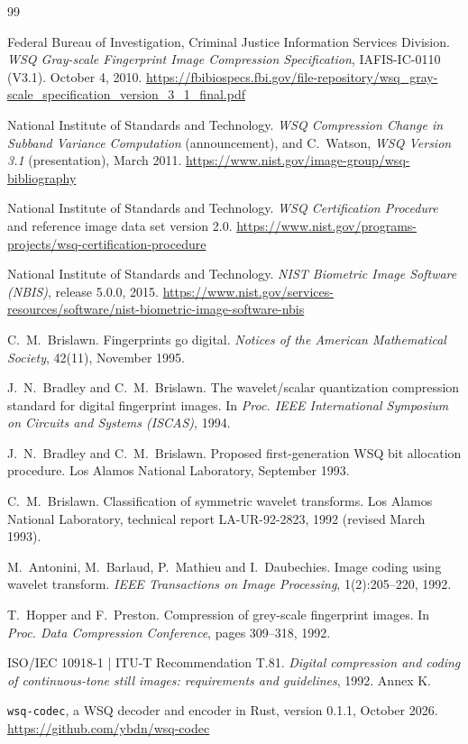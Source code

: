 \begin{thebibliography}{99}
\small

Federal Bureau of Investigation, Criminal Justice Information Services Division.
\emph{WSQ Gray-scale Fingerprint Image Compression Specification}, IAFIS-IC-0110 (V3.1).
October 4, 2010.
\url{https://fbibiospecs.fbi.gov/file-repository/wsq_gray-scale_specification_version_3_1_final.pdf}

National Institute of Standards and Technology.
\emph{WSQ Compression Change in Subband Variance Computation} (announcement), and
C.~Watson, \emph{WSQ Version 3.1} (presentation), March 2011.
\url{https://www.nist.gov/image-group/wsq-bibliography}

National Institute of Standards and Technology.
\emph{WSQ Certification Procedure} and reference image data set version 2.0.
\url{https://www.nist.gov/programs-projects/wsq-certification-procedure}

National Institute of Standards and Technology.
\emph{NIST Biometric Image Software (NBIS)}, release 5.0.0, 2015.
\url{https://www.nist.gov/services-resources/software/nist-biometric-image-software-nbis}

C.~M.~Brislawn.
Fingerprints go digital.
\emph{Notices of the American Mathematical Society}, 42(11), November 1995.

J.~N.~Bradley and C.~M.~Brislawn.
The wavelet/scalar quantization compression standard for digital fingerprint images.
In \emph{Proc. IEEE International Symposium on Circuits and Systems (ISCAS)}, 1994.

J.~N.~Bradley and C.~M.~Brislawn.
Proposed first-generation WSQ bit allocation procedure.
Los Alamos National Laboratory, September 1993.

C.~M.~Brislawn.
Classification of symmetric wavelet transforms.
Los Alamos National Laboratory, technical report LA-UR-92-2823, 1992 (revised March 1993).

M.~Antonini, M.~Barlaud, P.~Mathieu and I.~Daubechies.
Image coding using wavelet transform.
\emph{IEEE Transactions on Image Processing}, 1(2):205--220, 1992.

T.~Hopper and F.~Preston.
Compression of grey-scale fingerprint images.
In \emph{Proc. Data Compression Conference}, pages 309--318, 1992.

ISO/IEC 10918-1 | ITU-T Recommendation T.81.
\emph{Digital compression and coding of continuous-tone still images: requirements and
guidelines}, 1992. Annex K.

\texttt{wsq-codec}, a WSQ decoder and encoder in Rust, version 0.1.1, October 2026.
\url{https://github.com/ybdn/wsq-codec}

\end{thebibliography}
